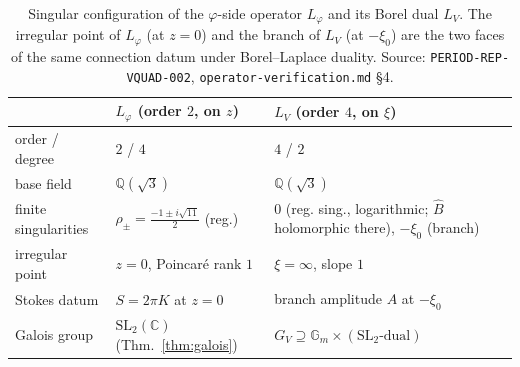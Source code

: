 \documentclass[11pt,reqno]{amsart}
\renewcommand{\_}{\vquadorigunderscore\allowbreak}
\theoremstyle{plain}
\theoremstyle{definition}
\newcommand{\Bhat}{\widehat{B}}
\newcommand{\Lphi}{L_{\varphi}}
\newcommand{\LV}{L_{V}}
\newcommand{\Qsqrt}{\mathbb{Q}(\sqrt3)}
\newcommand{\xizero}{\xi_0}
\newcommand{\SL}{\mathrm{SL}}
\newcommand{\Gm}{\mathbb{G}_m}
\begin{document}
\begin{table}[h]
\centering
\begin{tabular}{@{}lll@{}}
\toprule
 & $\Lphi$ (order $2$, on $z$) & $\LV$ (order $4$, on $\xi$) \\
\midrule
order / degree & $2$ / $4$ & $4$ / $2$ \\
base field & $\Qsqrt$ & $\Qsqrt$ \\
finite singularities & $\rho_\pm=\tfrac{-1\pm i\sqrt{11}}2$ (reg.) & $0$ (reg. sing., logarithmic; $\Bhat$ holomorphic there), $-\xizero$ (branch) \\
irregular point & $z=0$, Poincar\'e rank $1$ & $\xi=\infty$, slope $1$ \\
Stokes datum & $S=2\pi K$ at $z=0$ & branch amplitude $A$ at $-\xizero$ \\
Galois group & $\SL_2(\mathbb{C})$ (Thm.~\ref{thm:galois}) & $G_V\supseteq\Gm\times(\SL_2\text{-dual})$ \\
\bottomrule
\end{tabular}
\caption{Singular configuration of the $\varphi$-side operator $\Lphi$ and its Borel dual $\LV$.
The irregular point of $\Lphi$ (at $z=0$) and the branch of $\LV$ (at $-\xizero$) are the two
faces of the same connection datum under Borel--Laplace duality. Source:
\texttt{PERIOD-REP-VQUAD-002}, \texttt{operator-verification.md} \S4.}
\label{tab:config}
\end{table}
\end{document}
